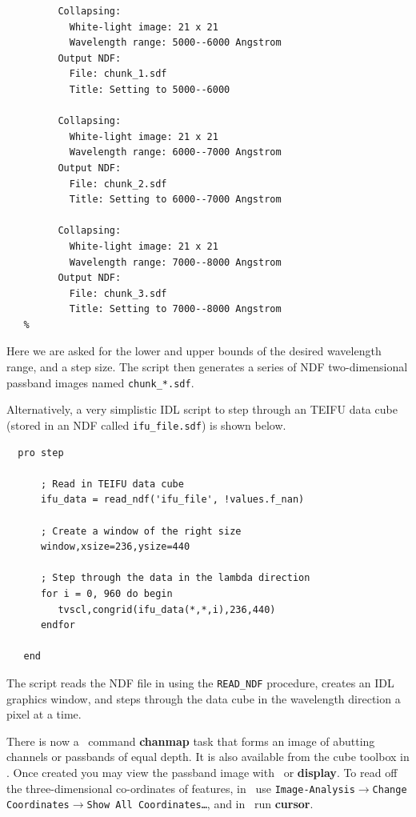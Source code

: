 \documentclass[twoside,11pt]{article}
\newcommand{\htmlref}[2]{#1}
\newcommand{\xref}[3]{#1}
\begin{document}
{\begin{verbatim}
         Collapsing:
           White-light image: 21 x 21
           Wavelength range: 5000--6000 Angstrom
         Output NDF:
           File: chunk_1.sdf
           Title: Setting to 5000--6000

         Collapsing:
           White-light image: 21 x 21
           Wavelength range: 6000--7000 Angstrom
         Output NDF:
           File: chunk_2.sdf
           Title: Setting to 6000--7000 Angstrom

         Collapsing:
           White-light image: 21 x 21
           Wavelength range: 7000--8000 Angstrom
         Output NDF:
           File: chunk_3.sdf
           Title: Setting to 7000--8000 Angstrom
   %
\end{verbatim}\normalsize

Here we are asked for the lower and upper bounds of the desired
wavelength range, and a step size.  The script then generates a series
of \xref{NDF}{sun33}{} two-dimensional passband images named \verb+chunk_*.sdf+. 

Alternatively, a very simplistic IDL script to step through an TEIFU
data cube (stored in an NDF called {\tt ifu\_file.sdf}) is shown below.

\small\begin{verbatim}
  pro step
      
      ; Read in TEIFU data cube
      ifu_data = read_ndf('ifu_file', !values.f_nan)
      
      ; Create a window of the right size
      window,xsize=236,ysize=440
      
      ; Step through the data in the lambda direction
      for i = 0, 960 do begin
         tvscl,congrid(ifu_data(*,*,i),236,440)
      endfor 
      
   end
\end{verbatim}\normalsize

The script reads the NDF file in using the {\tt READ\_NDF} procedure,
creates an IDL graphics window, and steps through the data cube in the
wavelength direction a pixel at a time.

There is now a \KAPPA\ command \xref{{\bf chanmap}}{sun95}{CHANMAP} task
that forms an image of abutting channels or passbands of equal depth.
It is also available from the \htmlref{cube toolbox}{sc16_cube_toolbox} 
in \GAIAref.  Once created you may view the passband image with \GAIA\ or
\xref{{\bf display}}{sun95}{DISPLAY}.  To read off the
three-dimensional co-ordinates of features, in \GAIA\ use
{\tt Image-Analysis$\rightarrow$Change Coordinates$\rightarrow$Show
All Coordinates\ldots}, and in \KAPPA\ run \xref{{\bf cursor}}{sun95}{CURSOR}.

}
\end{document}
